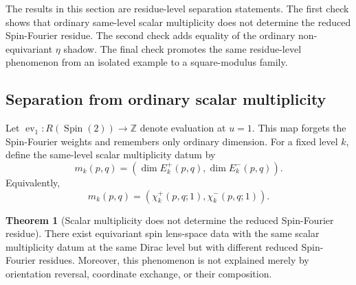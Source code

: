 \documentclass{article}
\theoremstyle{definition}
\newtheorem{theorem}{Theorem}[section]
\numberwithin{equation}{section}
\begin{document}
The results in this section are residue-level separation statements.  The first check shows that ordinary same-level scalar multiplicity does not determine the reduced Spin-Fourier residue.  The second check adds equality of the ordinary non-equivariant $\eta$ shadow.  The final check promotes the same residue-level phenomenon from an isolated example to a square-modulus family.

\subsection{Separation from ordinary scalar multiplicity}
\label{subsec:check-3A-scalar-multiplicity}

Let $\operatorname{ev}_1:R(\operatorname{Spin}(2))\to \mathbb Z$ denote evaluation at $u=1$.  This map forgets the Spin-Fourier weights and remembers only ordinary dimension.  For a fixed level $k$, define the same-level scalar multiplicity datum by
\begin{equation}
m_k(p,q)=\left(\dim E_k^+(p,q),\dim E_k^-(p,q)\right).
\end{equation}
Equivalently,
\begin{equation}
m_k(p,q)=\left(\chi_k^+(p,q;1),\chi_k^-(p,q;1)\right).
\end{equation}

\begin{theorem}[Scalar multiplicity does not determine the reduced Spin-Fourier residue]
There exist equivariant spin lens-space data with the same scalar multiplicity datum at the same Dirac level but with different reduced Spin-Fourier residues.  Moreover, this phenomenon is not explained merely by orientation reversal, coordinate exchange, or their composition.
\end{theorem}
\end{document}
